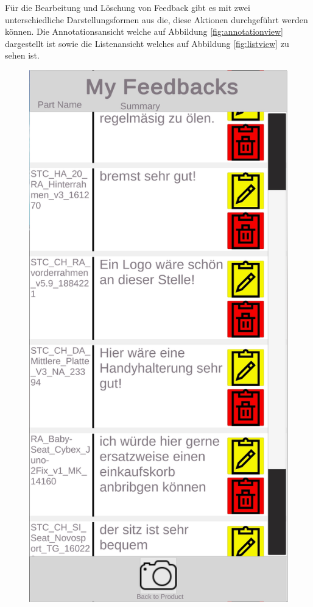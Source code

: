 Für die Bearbeitung und Löschung von Feedback gibt es mit zwei unterschiedliche Darstellungsformen aus die, diese Aktionen durchgeführt werden können. 
Die Annotationsansicht welche auf Abbildung \ref{fig:annotationview} dargestellt ist sowie die Listenansicht welches auf Abbildung \ref{fig:listview} zu sehen ist. 

\begin{figure}[H]
	\label{tab:example}
	\centering
	\begin{minipage}{.45\textwidth}
		\centering
		\includegraphics[width=.95\linewidth]{resources/implementation/listview.jpg}

\end{minipage}
\end{figure}
